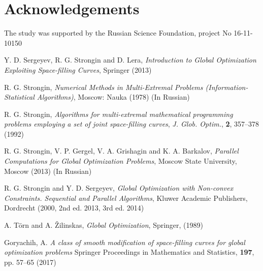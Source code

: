 \documentclass[runningheads]{llncs}
\begin{document}
\section*{Acknowledgements}
The study was supported by the Russian Science Foundation, project No 16-11-
10150

%
%
% 
% 
%
\begin{thebibliography}{107}

\newblock Y. D. Sergeyev, R. G. Strongin and D. Lera,
\newblock \emph{Introduction to Global Optimization Exploiting Space-filling Curves},
\newblock Springer (2013)

\newblock R. G. Strongin,
\newblock \emph{Numerical Methods in Multi-Extremal Problems (Information-Statistical Algorithms)},
\newblock Moscow: Nauka (1978) (In Russian)

\newblock R. G. Strongin,
\newblock \emph{\emph{Algorithms for multi-extremal mathematical programming problems
employing a set of joint space-filling curves}},
\newblock \emph{J. Glob. Optim.}, \textbf{2}, 357--378 (1992)

\newblock R. G. Strongin, V. P. Gergel, V. A. Grishagin and K. A. Barkalov,
\newblock \emph{Parallel Computations for Global Optimization Problems},
\newblock Moscow State University, Moscow (2013) (In Russian)

\newblock R. G. Strongin and Y. D. Sergeyev,
\newblock \emph{Global Optimization with Non-convex Constraints. Sequential and Parallel
Algorithms},
\newblock Kluwer Academic Publishers, Dordrecht (2000, 2nd ed. 2013, 3rd ed. 2014)

\newblock A. T\"orn and A. \v Zilinskas,
\newblock \emph{Global Optimization},
\newblock Springer, (1989)

\newblock Goryachih, A.
\newblock \emph{A class of smooth modification of space-filling curves for global optimization
problems}
\newblock Springer Proceedings in Mathematics and Statistics, \textbf{197}, pp. 57--65 (2017)


\end{thebibliography}
\end{document}
